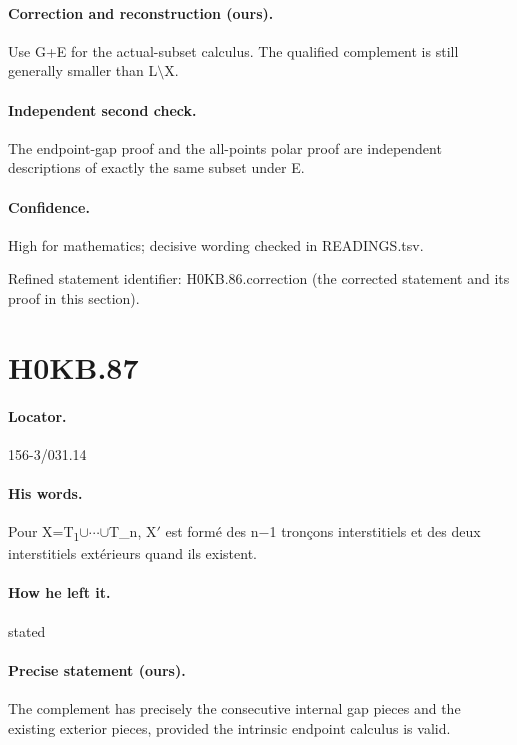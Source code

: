 \paragraph{Correction and reconstruction (ours).} Use G+E for the actual-subset calculus. The qualified complement is still generally smaller than L\ensuremath{\setminus}X.

\paragraph{Independent second check.} The endpoint-gap proof and the all-points polar proof are independent descriptions of exactly the same subset under E.

\paragraph{Confidence.} High for mathematics; decisive wording checked in READINGS.tsv.

\noindent Refined statement identifier: H0KB.86.correction (the corrected statement and its proof in this section).

\section*{H0KB.87}\label{statement:H0KB.87}
\paragraph{Locator.} 156-3/031.14

\paragraph{His words.} Pour X=T\textsubscript{1}\ensuremath{\cup}\ensuremath{\cdots}\ensuremath{\cup}T\_n, X\ensuremath{\prime} est formé des n\ensuremath{-}1 tronçons interstitiels et des deux interstitiels extérieurs quand ils existent.

\paragraph{How he left it.} stated

\paragraph{Precise statement (ours).} The complement has precisely the consecutive internal gap pieces and the existing exterior pieces, provided the intrinsic endpoint calculus is valid.

